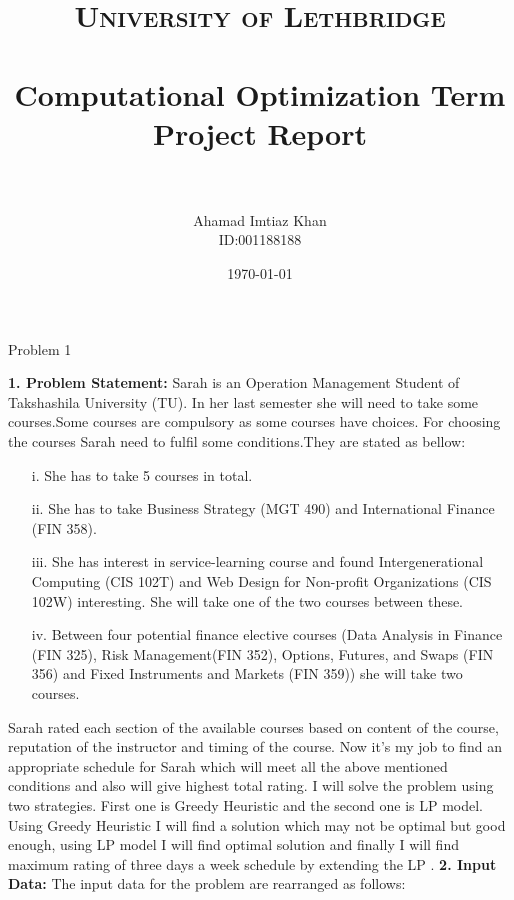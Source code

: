 \documentclass[paper=letter, fontsize=11pt]{scrartcl} %
\title{	
\normalfont \normalsize 
\textsc{University of Lethbridge} \\ [25pt] %
\horrule{0.5pt} \\[0.4cm] %
\huge Computational Optimization Term Project Report\\ %
\horrule{2pt} \\[0.5cm] %
}
\author{Ahamad Imtiaz Khan\\ID:001188188} %
\date{\normalsize\today} %
\begin{document}
\maketitle %

\begin{center}
\LARGE Problem 1
\end{center}

\Large \textbf{1. Problem Statement:}
\normalsize Sarah is an Operation Management Student of Takshashila University (TU). In her 
last semester she will need to take some courses.Some courses are compulsory as some courses have choices.
For choosing the courses Sarah need to fulfil some conditions.They are stated as bellow:
    
\begin{enumerate} [align=left,style=nextline,leftmargin=1.5cm,labelsep=\parindent,font=\normalfont]
\item[i.] She has to take 5 courses in total.
\item[ii.] She has to take Business Strategy (MGT 490) and International Finance (FIN 358).
\item[iii.] She has interest in service-learning course and found Intergenerational Computing (CIS 102T) and Web Design for Non-profit Organizations (CIS 102W) interesting. She will take one of the two courses 
between these.
\item[iv.] Between four potential finance elective courses (Data Analysis in Finance (FIN 325),
 Risk Management(FIN 352), Options, Futures, and Swaps (FIN 356) and 
Fixed Instruments and Markets (FIN 359)) she will take two courses.
\end{enumerate}

Sarah rated each section of the available courses based on content of the course, reputation of the instructor and timing of the course. Now it's my job to find an appropriate schedule for Sarah which will meet all the above mentioned conditions and also will give highest total rating. I will solve the problem using two strategies. First one is Greedy Heuristic and the second one is LP model. Using Greedy Heuristic I will find a solution which may not be optimal but good enough, using LP model I will find optimal solution and finally I will find maximum rating of three days a week schedule by extending the LP .
\newline
\newline
\Large \textbf{2. Input Data:}
\normalsize The input data for the problem are rearranged as follows: 
\end{document}
